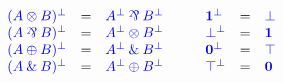 \begin{definition}[Duality]\label{def:cp-negation}
  \[\!
    \begin{array}{lclclcl}
              \ty{(A \tens B)^\bot} &=& \ty{A^\bot \parr B^\bot}
      &\quad& \ty{\one^\bot}        &=& \ty{\bot}
      \\      \ty{(A \parr B)^\bot} &=& \ty{A^\bot \tens B^\bot}
      &\quad& \ty{\bot^\bot}        &=& \ty{\one}
      \\      \ty{(A \plus B)^\bot} &=& \ty{A^\bot \with B^\bot}
      &\quad& \ty{\nil^\bot}        &=& \ty{\top}
      \\      \ty{(A \with B)^\bot} &=& \ty{A^\bot \plus B^\bot}
      &\quad& \ty{\top^\bot}        &=& \ty{\nil}
    \end{array}
  \]
\end{definition}
